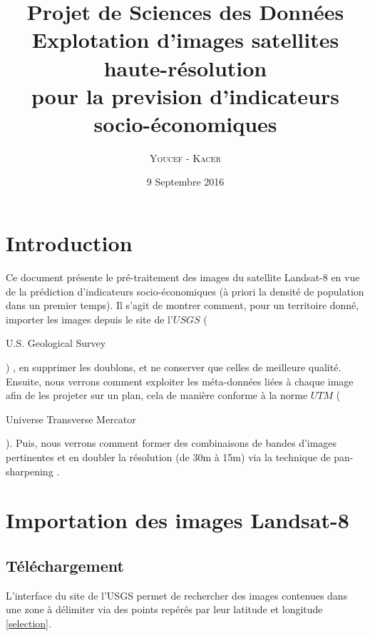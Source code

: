\documentclass{book}
\title{%
  Projet de Sciences des Données \\
  \large Explotation d'images satellites haute-résolution \\pour la prevision d'indicateurs socio-économiques \\
    }
\author{\textsc{Youcef} - \textsc{Kacer}}
\date{9 Septembre 2016}
\begin{document}
 
\maketitle

\tableofcontents

\frontmatter
\chapter{Introduction}
Ce document présente le pré-traitement des images du satellite Landsat-8 en vue de la prédiction d'indicateurs socio-économiques (à 
priori la densité de population dans un premier temps). Il s'agit de montrer comment, pour un territoire donné,
importer les images depuis le site de l'$USGS$ (\begin{itshape}U.S. Geological Survey\end{itshape}) \cite{landsat8}, en supprimer les doublons, et ne conserver 
que celles de meilleure qualité.
Ensuite, nous verrons comment exploiter les méta-données liées à chaque image afin de les projeter sur un plan, cela de manière conforme
à la norme $UTM$ (\begin{itshape}Universe Transverse Mercator\end{itshape}).
Puis, nous verrons comment former des combinaisons de bandes d'images pertinentes et en doubler la résolution (de 30m à 15m) via
la technique de \og pan-sharpening \fg{}.
\mainmatter

\chapter{Importation des images Landsat-8}
\section{Téléchargement}

L'interface du site de l'USGS permet de rechercher des images contenues dans une zone à délimiter via des points repérés par 
leur latitude et longitude \ref{selection}.\\
\end{document}

